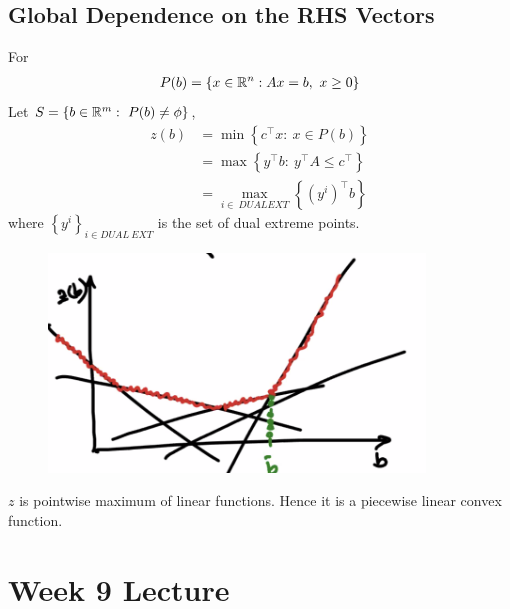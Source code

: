 \documentclass[11pt]{article}
\numberwithin{equation}{section}
\begin{document}
\subsection{Global Dependence on the RHS Vectors}
For
\begin{align*}
    P(b) = \left\{x \in \mathbb R^{n}: A x=b, \  x \geq 0\right\}
\end{align*}
Let $S= \left\{ b \in \mathbb R^m: \ P(b) \neq \phi \right\}$, \begin{align*}
    z(b) &= \min \left\{ c^\top x: \ x \in P(b) \right\} \\
    &= \max \left\{ y^\top b: \ y^\top A \leq c^\top \right\} \\
    &= \max_{i \in \ DUAL EXT} \left\{ \left( y^i \right)^\top b \right\}
\end{align*}
where $\left\{ y^i \right\}_{i \in DUAL \ EXT}$ is the set of dual extreme points. 

\begin{figure}[H]
    \centering
    \includegraphics[width=10cm]{images/7-ex-3.png}
\end{figure}

$z$ is pointwise maximum of linear functions. Hence it is a piecewise linear convex function.

\newpage
\section{Week 9 Lecture}
\end{document}
